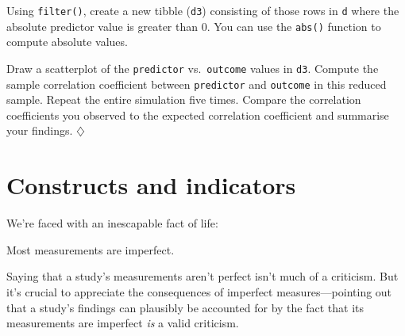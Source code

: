 \documentclass[a4paper]{tufte-book}\usepackage[]{graphicx}\usepackage[]{xcolor}
\newcommand*{\parend}[1][$\diamondsuit$]{%
\leavevmode\unskip\penalty9999 \hbox{}\nobreak\hfill
    \quad\hbox{#1}%
}
\begin{document}
\begin{enumerate}
    Using \texttt{filter()}, create a new tibble (\texttt{d3}) consisting
    of those rows in \texttt{d} where the absolute predictor value is greater than 0.
    You can use the \texttt{abs()} function to compute absolute values.

    Draw a scatterplot of the \texttt{predictor}
    vs.\ \texttt{outcome} values in \texttt{d3}.
    Compute the sample correlation coefficient between \texttt{predictor}
    and \texttt{outcome} in this reduced sample.
    Repeat the entire simulation five times.
    Compare the correlation coefficients you observed to the expected correlation coefficient
    and summarise your findings.\parend
  \end{enumerate}


\chapter{Constructs and indicators}\label{ch:measurementerror}

We're faced with an inescapable fact of life:

\medskip

\begin{framed}
Most measurements are imperfect.
\end{framed}

\medskip

Saying that a study's measurements aren't perfect isn't much of a criticism.
But it's crucial to appreciate the consequences of imperfect measures---pointing
out that a study's findings can plausibly be accounted for by the fact
that its measurements are imperfect \emph{is} a valid criticism.

\medskip
\end{document}
